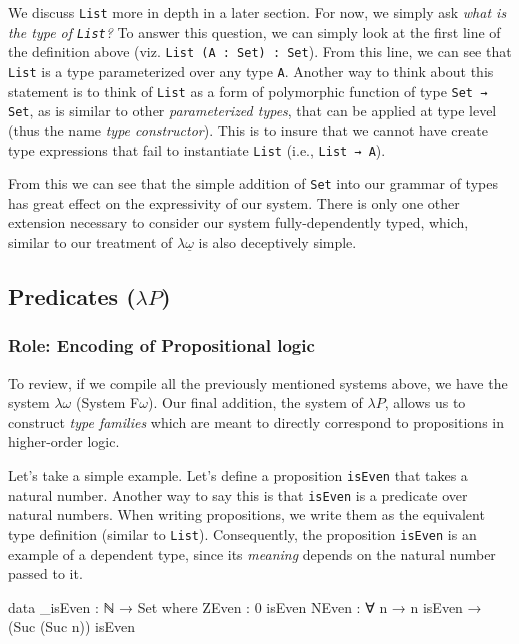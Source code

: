 \documentclass[12pt]{article}
\begin{document}
We discuss {\tt List} more in depth in a later section. For now, we simply ask
{\em what is the type of {\tt List}?} To answer this question, we can simply
look at the first line of the definition above (viz. {\tt List (A : Set) : Set}).
From this line, we can see that {\tt List} is a type parameterized over any type
{\tt A}. Another way to think about this statement is to think of {\tt List} as
a form of polymorphic function of type {\tt Set → Set}, as is similar to other
{\em parameterized types}, that can be applied at type level (thus the name
{\em type constructor}). This is to insure that we cannot have create type
expressions that fail to instantiate {\tt List} (i.e., {\tt List → A}).

From this we can see that the simple addition of {\tt Set} into our grammar of
types has great effect on the expressivity of our system. There is only one
other extension necessary to consider our system fully-dependently typed, which,
similar to our treatment of \(\lambda\underline{\omega}\) is also deceptively
simple.

\subsection*{Predicates (\(\lambda P\))}
\subsubsection*{Role: Encoding of Propositional logic}

To review, if we compile all the previously mentioned systems above, we have
the system \(\lambda\omega\) (System F\(\omega\)). Our final addition, the
system of \(\lambda P\), allows us to construct {\em type families} which are
meant to directly correspond to propositions in higher-order logic.

Let's take a simple example. Let's define a proposition {\tt isEven} that takes
a natural number. Another way to say this is that {\tt isEven} is a predicate
over natural numbers. When writing propositions, we write them as the equivalent
type definition (similar to {\tt List}). Consequently, the proposition
{\tt isEven} is an example of a dependent type, since its {\em meaning} depends
on the natural number passed to it.

\begin{center}
\begin{minipage}{0.7\textwidth}
\begin{code}
data _isEven : ℕ → Set where
  ZEven : 0 isEven
  NEven : ∀ n → n isEven → (Suc (Suc n)) isEven
\end{code}
\end{minipage}
\end{center}
\end{document}

